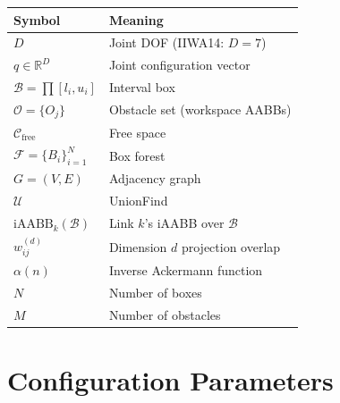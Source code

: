 \documentclass[journal]{IEEEtran}
\newcommand{\Cfree}{\mathcal{C}_\text{free}}
\newcommand{\iAABB}{\text{iAABB}}
\newcommand{\Real}{\mathbb{R}}
\newcommand{\calO}{\mathcal{O}}
\newcommand{\calF}{\mathcal{F}}
\begin{document}
\begin{table}[ht]
\centering
\small
\begin{tabular}{@{}ll@{}}
\toprule
\textbf{Symbol} & \textbf{Meaning} \\
\midrule
$D$ & Joint DOF (IIWA14: $D=7$) \\
$q \in \Real^D$ & Joint configuration vector \\
$\mathcal{B} = \prod [l_i, u_i]$ & Interval box \\
$\calO = \{O_j\}$ & Obstacle set (workspace AABBs) \\
$\Cfree$ & Free space \\
$\calF = \{B_i\}_{i=1}^N$ & Box forest \\
$G = (V, E)$ & Adjacency graph \\
$\mathcal{U}$ & UnionFind \\
$\iAABB_k(\mathcal{B})$ & Link $k$'s iAABB over $\mathcal{B}$ \\
$w_{ij}^{(d)}$ & Dimension $d$ projection overlap \\
$\alpha(n)$ & Inverse Ackermann function \\
$N$ & Number of boxes \\
$M$ & Number of obstacles \\
\bottomrule
\end{tabular}
\end{table}

\section{Configuration Parameters}\label{app:config}
\end{document}
